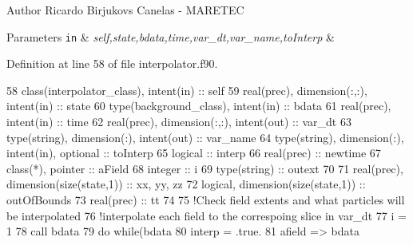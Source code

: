 \begin{DoxyAuthor}{Author}
Ricardo Birjukovs Canelas -\/ M\+A\+R\+E\+T\+EC 
\end{DoxyAuthor}

\begin{DoxyParams}[1]{Parameters}
\mbox{\tt in}  & {\em self,state,bdata,time,var\+\_\+dt,var\+\_\+name,to\+Interp} & \\
\hline
\end{DoxyParams}


Definition at line 58 of file interpolator.\+f90.


\begin{DoxyCode}
58     \textcolor{keywordtype}{class}(interpolator\_class), \textcolor{keywordtype}{intent(in)} :: self
59     \textcolor{keywordtype}{real(prec)}, \textcolor{keywordtype}{dimension(:,:)}, \textcolor{keywordtype}{intent(in)} :: state
60     \textcolor{keywordtype}{type}(background\_class), \textcolor{keywordtype}{intent(in)} :: bdata
61     \textcolor{keywordtype}{real(prec)}, \textcolor{keywordtype}{intent(in)} :: time
62     \textcolor{keywordtype}{real(prec)}, \textcolor{keywordtype}{dimension(:,:)}, \textcolor{keywordtype}{intent(out)} :: var\_dt
63     \textcolor{keywordtype}{type}(string), \textcolor{keywordtype}{dimension(:)}, \textcolor{keywordtype}{intent(out)} :: var\_name
64     \textcolor{keywordtype}{type}(string), \textcolor{keywordtype}{dimension(:)}, \textcolor{keywordtype}{intent(in)}, \textcolor{keywordtype}{optional} :: toInterp
65     \textcolor{keywordtype}{logical} :: interp
66     \textcolor{keywordtype}{real(prec)} :: newtime
67     \textcolor{keywordtype}{class}(*), \textcolor{keywordtype}{pointer} :: aField
68     \textcolor{keywordtype}{integer} :: i
69     \textcolor{keywordtype}{type}(string) :: outext
70 
71     \textcolor{keywordtype}{real(prec)}, \textcolor{keywordtype}{dimension(size(state,1))} :: xx, yy, zz
72     \textcolor{keywordtype}{logical}, \textcolor{keywordtype}{dimension(size(state,1))} :: outOfBounds
73     \textcolor{keywordtype}{real(prec)} :: tt
74 
75     \textcolor{comment}{!Check field extents and what particles will be interpolated}
76     \textcolor{comment}{!interpolate each field to the correspoing slice in var\_dt}
77     i = 1
78     \textcolor{keyword}{call }bdata%
79     \textcolor{keywordflow}{do} \textcolor{keywordflow}{while}(bdata%
80         interp = .true.
81         afield => bdata%

\end{DoxyCode}
